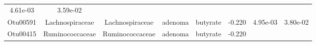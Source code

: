 \documentclass[11pt,]{article}
\begin{document}
\begin{longtable}[]{@{}cccccccc@{}}
\begin{minipage}[t]{0.08\columnwidth}
4.61e-03\strut
\end{minipage} & \begin{minipage}[t]{0.08\columnwidth}\centering\strut
3.59e-02\strut
\end{minipage}\tabularnewline
\begin{minipage}[t]{0.08\columnwidth}\centering\strut
Otu00591\strut
\end{minipage} & \begin{minipage}[t]{0.15\columnwidth}\centering\strut
Lachnospiraceae\strut
\end{minipage} & \begin{minipage}[t]{0.15\columnwidth}\centering\strut
Lachnospiraceae\strut
\end{minipage} & \begin{minipage}[t]{0.08\columnwidth}\centering\strut
adenoma\strut
\end{minipage} & \begin{minipage}[t]{0.09\columnwidth}\centering\strut
butyrate\strut
\end{minipage} & \begin{minipage}[t]{0.07\columnwidth}\centering\strut
-0.220\strut
\end{minipage} & \begin{minipage}[t]{0.08\columnwidth}\centering\strut
4.95e-03\strut
\end{minipage} & \begin{minipage}[t]{0.08\columnwidth}\centering\strut
3.80e-02\strut
\end{minipage}\tabularnewline
\begin{minipage}[t]{0.08\columnwidth}\centering\strut
Otu00415\strut
\end{minipage} & \begin{minipage}[t]{0.15\columnwidth}\centering\strut
Ruminococcaceae\strut
\end{minipage} & \begin{minipage}[t]{0.15\columnwidth}\centering\strut
Ruminococcaceae\strut
\end{minipage} & \begin{minipage}[t]{0.08\columnwidth}\centering\strut
adenoma\strut
\end{minipage} & \begin{minipage}[t]{0.09\columnwidth}\centering\strut
butyrate\strut
\end{minipage} & \begin{minipage}[t]{0.07\columnwidth}\centering\strut
-0.220\strut
\end{minipage} & \begin{minipage}[t]{0.08\columnwidth}\centering\strut

\end{minipage}
\end{longtable}
\end{document}
